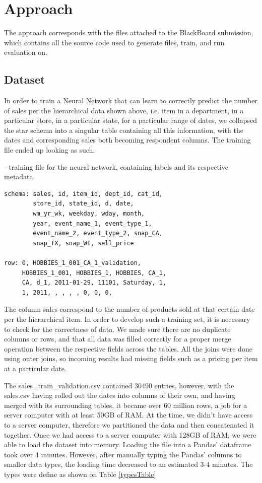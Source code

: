 \documentclass[10pt,twocolumn,letterpaper]{article}
\begin{document}
\section{Approach}
  The approach corresponds with the files attached to the BlackBoard submission,
  which contains all the source code used to generate files, train, and run
  evaluation on.

\subsection{Dataset}
  In order to train a Neural Network that can learn to correctly predict the
  number of sales per the hierarchical data shown above, i.e. item in a
  department, in a particular store, in a particular state, for a particular
  range of dates, we collapsed the star schema into a singular table containing
  all this information, with the dates and corresponding sales both
  becoming respondent columns. The training file ended up looking as such.

 - training file for the neural network, containing
labels and its respective metadata.

{\small\begin{verbatim}
schema: sales, id, item_id, dept_id, cat_id,
        store_id, state_id, d, date,
        wm_yr_wk, weekday, wday, month,
        year, event_name_1, event_type_1,
        event_name_2, event_type_2, snap_CA,
        snap_TX, snap_WI, sell_price

row: 0, HOBBIES_1_001_CA_1_validation,
     HOBBIES_1_001, HOBBIES_1, HOBBIES, CA_1,
     CA, d_1, 2011-01-29, 11101, Saturday, 1,
     1, 2011, , , , , 0, 0, 0,
\end{verbatim}}


The column sales correspond to the number of products sold at that certain date
per the hierarchical item. In order to develop such a training set, it is
necessary to check for the correctness of data. We made sure there are no
duplicate columns or rows, and that all data was filled correctly for a proper
merge operation between the respective fields across the tables. All the joins
were done using outer joins, so incoming results had missing fields such as a
pricing per item at a particular date.

 The sales\_train\_validation.csv contained 30490 entries, however, with the
sales.csv having rolled out the dates into columns of their own, and having
merged with its surrounding tables, it became over 60 million rows, a job for a
server computer with at least 50GB of RAM. At the time, we didn't have access to
a server computer, therefore we partitioned the data and then concatenated it
together. Once we had access to a server computer with 128GB of RAM, we were
able to load the dataset into memory. Loading the file into a Pandas' dataframe
took over 4 minutes. However, after manually typing the Pandas' columns to
smaller data types, the loading time decreased to an estimated 3-4 minutes. The types were
define as shown on Table \ref{typesTable}
\end{document}
